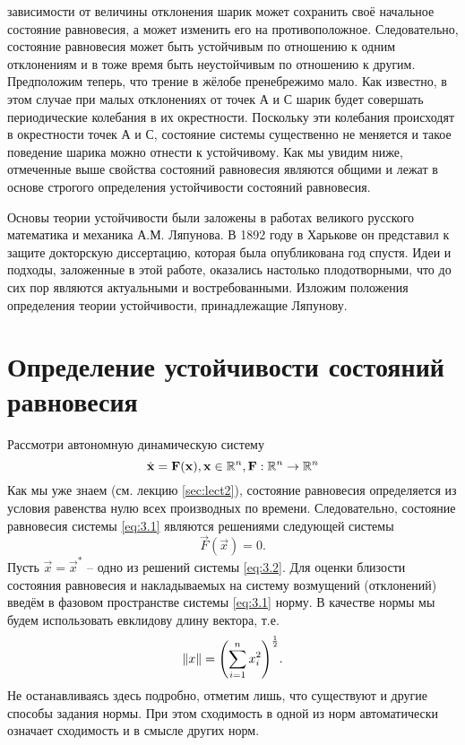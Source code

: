 зависимости от величины отклонения шарик может сохранить своё начальное
состояние равновесия, а может изменить его на противоположное.
Следовательно, состояние равновесия может быть устойчивым по отношению к
одним отклонениям и в тоже время быть неустойчивым по отношению к
другим. Предположим теперь, что трение в жёлобе пренебрежимо мало. Как
известно, в этом случае при малых отклонениях от точек А и С шарик будет
совершать периодические колебания в их окрестности. Поскольку эти
колебания происходят в окрестности точек А и С, состояние системы
существенно не меняется и такое поведение шарика можно отнести к
устойчивому. Как мы увидим ниже, отмеченные выше свойства состояний
равновесия являются общими и лежат в основе строгого определения
устойчивости состояний равновесия.

Основы теории устойчивости были заложены в работах великого
русского математика и механика А.М. Ляпунова. В 1892 году в Харькове он
представил к защите докторскую диссертацию, которая была опубликована год
спустя. Идеи и подходы, заложенные в этой работе, оказались настолько
плодотворными, что до сих пор являются актуальными и востребованными.
Изложим положения определения теории устойчивости, принадлежащие
Ляпунову.

\section{Определение устойчивости состояний равновесия}%


Рассмотри автономную динамическую систему
\begin{equation}
    \label{eq:3.1}
    \dot {\mathbf{x}} =  \mathbf{F}(\mathbf{x}), \mathbf{x} \in \mathbb{R}^n,   \mathbf{F}: \mathbb{R}^n \rightarrow \mathbb{R}^n
\end{equation}
Как мы уже знаем (см. лекцию \ref{sec:lect2}), состояние равновесия определяется из условия равенства нулю всех производных по времени. Следовательно, состояние равновесия системы \eqref{eq:3.1} являются решениями следующей системы
\begin{equation}
    \label{eq:3.2}
    \vec F(\vec x) = 0 . 
\end{equation}
Пусть $\vec x= \vec x^*$ -- одно из решений системы \eqref{eq:3.2}. Для оценки близости состояния равновесия и накладываемых на систему возмущений (отклонений) введём в фазовом пространстве системы    \eqref{eq:3.1} норму. В качестве нормы мы будем использовать евклидову длину вектора, т.е.
\begin{equation}
    \label{eq:}
    \norm {x}=\qty( \sum\limits_{i=1}^n x_i^2) ^{\frac12}.
\end{equation}
Не останавливаясь здесь подробно, отметим лишь, что существуют и другие способы задания нормы. При этом сходимость в одной из норм автоматически означает сходимость и в смысле других норм.

